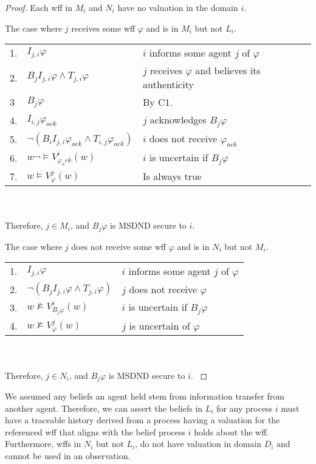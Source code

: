 \begin{proof}
Each wff in $M_i$ and $N_i$ have no valuation in the domain $i$.

\begin{case}
The case where $j$ receives some wff $\varphi$ and is in $M_i$ but not $L_i$.
\end{case}

\begin{table}[H]
\centering
\small
\begin{tabularx}{\linewidth}{l l X}
1. & $I_{j,i} \varphi$ & $i$ informs some agent $j$ of $\varphi$ \\
2. & $B_{j}I_{j,i} \varphi \wedge T_{j,i} \varphi$ & $j$ receives $\varphi$ and believes its authenticity \\
3  & $B_j \varphi$ & By C1. \\
4. & $I_{i,j} \varphi_{ack}$ & $j$ acknowledges $B_j \varphi$ \\
5. & $\neg(B_{i}I_{j,i} \varphi_{ack} \wedge T_{i,j} \varphi_{ack})$ & $i$ does not receive $\varphi_{ack}$ \\
6. & $w \neg \vDash V_{\varphi_ack}^{i}(w)$ & $i$ is uncertain if $B_j \varphi$ \\
7. & $w \vDash V_{\varphi}^{j}(w)$ & Is always true %
\end{tabularx} \\~\\
Therefore, $j \in M_i$, and $B_j \varphi$ is MSDND secure to $i$.
\label{tab:msetsecurity}
\end{table}

\begin{case}
The case where $j$ does not receive some wff $\varphi$ and is in $N_i$ but not $M_i$.
\end{case}

\begin{table}[H]
\centering
\small
\begin{tabularx}{\linewidth}{l l X}
1. & $I_{j,i} \varphi$ & $i$ informs some agent $j$ of $\varphi$ \\
2. & $\neg(B_{j}I_{j,i} \varphi \wedge T_{j,i} \varphi)$ & $j$ does not receive $\varphi$ \\
3. & $w \not \vDash V_{B_j \varphi}^{i}(w)$ & $i$ is uncertain if $B_j \varphi$ \\
4. & $w \not \vDash V_{\varphi}^{j}(w)$ & $j$ is uncertain of $\varphi$ %
\end{tabularx} \\~\\
Therefore, $j \in N_i$, and $B_j \varphi$ is MSDND secure to $i$.
\label{tab:nsetsecurity}
\end{table}
\end{proof}

We assumed any beliefs an agent held stem from information transfer from another agent.
Therefore, we can assert the beliefs in $L_i$ for any process $i$ must have a traceable history derived from a process having a valuation for the referenced wff that aligns with the belief process $i$ holds about the wff.
Furthermore, wffs in $N_i$ but not $L_i$, do not have valuation in domain $D_i$ and cannot be used in an observation.